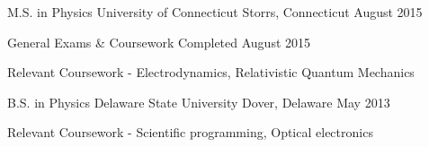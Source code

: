 

\begin{cventries}


\cventry
{M.S. in Physics}
{University of Connecticut}
{Storrs, Connecticut}
{August 2015}
{
\begin{cvitems}
\item General Exams \& Coursework Completed August 2015
\item Relevant Coursework - Electrodynamics, Relativistic Quantum Mechanics
\end{cvitems}
}

\cventry
    {B.S. in Physics} %
    {Delaware State University} %
    {Dover, Delaware} %
    {May 2013} %
    {
        \begin{cvitems}
            \item Relevant Coursework - Scientific programming, Optical electronics
        \end{cvitems}
    }
\end{cventries}
